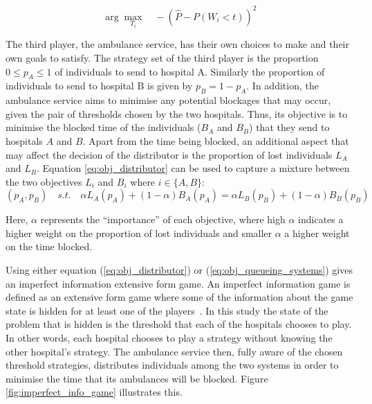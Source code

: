 \begin{equation}\label{eq:obj_queueing_systems}
    \arg \max_{T_i} \quad -\left( \hat{P} - P(W_i < t) \right)^2
\end{equation}


The third player, the ambulance service, has their own choices to make and 
their own 
goals to satisfy.
The strategy set of the third player is the proportion \(0 \leq p_A \leq 1\) of 
individuals to send to hospital A.
Similarly the proportion of individuals to send to hospital B is given by
\(p_B = 1 - p_A\).
In addition, the ambulance service aims to minimise any potential blockages
that may occur, given the pair of thresholds chosen by the two hospitals.
Thus, its objective is to minimise the blocked time of the individuals 
(\(B_A\) and \(B_B\))
that they send to hospitals \(A\) and \(B\).
Apart from the time being blocked, an additional aspect that may affect the 
decision of the distributor is the proportion of lost individuals 
\(L_A\) and \(L_B\).
Equation \ref{eq:obj_distributor} can be used to capture a mixture 
between the two objectives \(L_i\) and \(B_i\) where \(i \in \{A, B\}\):
\begin{equation*}\label{eq:obj_distributor}
    (p_A, p_B) \quad s.t. \quad 
    \alpha L_A(p_A) + (1 - \alpha) B_A(p_A) = 
    \alpha L_B(p_B) + (1 - \alpha) B_B(p_B)
\end{equation*}

Here, \(\alpha\) represents the ``importance'' of each objective,
where high \(\alpha\) indicates a higher weight on the proportion of lost 
individuals and smaller \(\alpha\) a higher weight on the time blocked. 

Using either equation (\ref{eq:obj_distributor}) or 
(\ref{eq:obj_queueing_systems}) gives an imperfect information extensive form 
game. 
An imperfect information game is defined as an extensive form game where some 
of the information about the game state is hidden for at least one of the 
players~\cite{Berwanger2008}. In this study the state of the problem that is
hidden is the threshold that each of the hospitals chooses to play.
In other words, each hospital chooses to play a strategy without 
knowing the other hospital's strategy.
The ambulance service then, fully aware of the chosen threshold strategies, 
distributes individuals among the two systems in order to minimise the time 
that its ambulances will be blocked. 
Figure \ref{fig:imperfect_info_game} illustrates this. 

